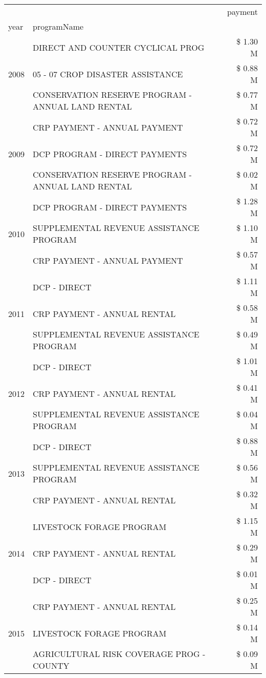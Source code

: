 \begin{tabular}{llr}
\toprule
 &  & payment \\
year & programName &  \\
\midrule
\multirow[t]{3}{*}{2008} & DIRECT AND COUNTER CYCLICAL PROG & \$ 1.30 M \\
 & 05 - 07 CROP DISASTER ASSISTANCE & \$ 0.88 M \\
 & CONSERVATION RESERVE PROGRAM - ANNUAL LAND RENTAL & \$ 0.77 M \\
\cline{1-3}
\multirow[t]{3}{*}{2009} & CRP PAYMENT - ANNUAL PAYMENT & \$ 0.72 M \\
 & DCP PROGRAM - DIRECT PAYMENTS & \$ 0.72 M \\
 & CONSERVATION RESERVE PROGRAM - ANNUAL LAND RENTAL & \$ 0.02 M \\
\cline{1-3}
\multirow[t]{3}{*}{2010} & DCP PROGRAM - DIRECT PAYMENTS & \$ 1.28 M \\
 & SUPPLEMENTAL REVENUE ASSISTANCE PROGRAM & \$ 1.10 M \\
 & CRP PAYMENT - ANNUAL PAYMENT & \$ 0.57 M \\
\cline{1-3}
\multirow[t]{3}{*}{2011} & DCP - DIRECT & \$ 1.11 M \\
 & CRP PAYMENT - ANNUAL RENTAL & \$ 0.58 M \\
 & SUPPLEMENTAL REVENUE ASSISTANCE PROGRAM & \$ 0.49 M \\
\cline{1-3}
\multirow[t]{3}{*}{2012} & DCP - DIRECT & \$ 1.01 M \\
 & CRP PAYMENT - ANNUAL RENTAL & \$ 0.41 M \\
 & SUPPLEMENTAL REVENUE ASSISTANCE PROGRAM & \$ 0.04 M \\
\cline{1-3}
\multirow[t]{3}{*}{2013} & DCP - DIRECT & \$ 0.88 M \\
 & SUPPLEMENTAL REVENUE ASSISTANCE PROGRAM & \$ 0.56 M \\
 & CRP PAYMENT - ANNUAL RENTAL & \$ 0.32 M \\
\cline{1-3}
\multirow[t]{3}{*}{2014} & LIVESTOCK FORAGE PROGRAM & \$ 1.15 M \\
 & CRP PAYMENT - ANNUAL RENTAL & \$ 0.29 M \\
 & DCP - DIRECT & \$ 0.01 M \\
\cline{1-3}
\multirow[t]{3}{*}{2015} & CRP PAYMENT - ANNUAL RENTAL & \$ 0.25 M \\
 & LIVESTOCK FORAGE PROGRAM & \$ 0.14 M \\
 & AGRICULTURAL RISK COVERAGE PROG - COUNTY & \$ 0.09 M \\
\cline{1-3}

\end{tabular}
